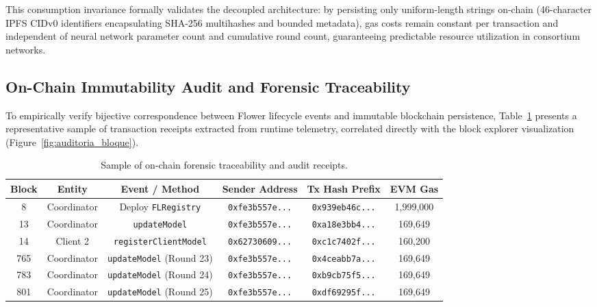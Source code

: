 This consumption invariance formally validates the decoupled architecture: by persisting only uniform-length strings on-chain (46-character IPFS CIDv0 identifiers encapsulating SHA-256 multihashes and bounded metadata), gas costs remain constant per transaction and independent of neural network parameter count and cumulative round count, guaranteeing predictable resource utilization in consortium networks.

\subsection{On-Chain Immutability Audit and Forensic Traceability}
\label{subsec:auditoria_onchain}
To empirically verify bijective correspondence between Flower lifecycle events and immutable blockchain persistence, Table~\ref{tab:auditoria_transacciones} presents a representative sample of transaction receipts extracted from runtime telemetry, correlated directly with the block explorer visualization (Figure~\ref{fig:auditoria_bloque}).

\begin{table}[htbp]
\caption{Sample of on-chain forensic traceability and audit receipts.}\label{tab:auditoria_transacciones}
\footnotesize
\setlength{\tabcolsep}{4pt}
\renewcommand{\arraystretch}{1.15}
\begin{tabular*}{\textwidth}{@{\extracolsep\fill}cccccc}
\toprule
\textbf{Block} & \textbf{Entity} & \textbf{Event / Method} & \textbf{Sender Address} & \textbf{Tx Hash Prefix} & \textbf{EVM Gas} \\
\midrule
8 & Coordinator & Deploy \texttt{FLRegistry} & \texttt{0xfe3b557e...} & \texttt{0x939eb46c...} & 1,999,000 \\
13 & Coordinator & \texttt{updateModel} & \texttt{0xfe3b557e...} & \texttt{0xa18e3bb4...} & 169,649 \\
14 & Client 2 & \texttt{registerClientModel} & \texttt{0x62730609...} & \texttt{0xc1c7402f...} & 160,200 \\
\midrule
765 & Coordinator & \texttt{updateModel} (Round 23) & \texttt{0xfe3b557e...} & \texttt{0x4ceabb7a...} & 169,649 \\
783 & Coordinator & \texttt{updateModel} (Round 24) & \texttt{0xfe3b557e...} & \texttt{0xb9cb75f5...} & 169,649 \\
801 & Coordinator & \texttt{updateModel} (Round 25) & \texttt{0xfe3b557e...} & \texttt{0xdf69295f...} & 169,649 \\
\bottomrule
\end{tabular*}
\end{table}

